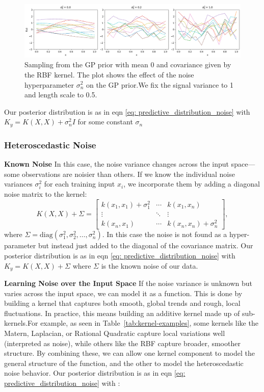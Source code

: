 \documentclass{article}
\begin{document}
\begin{figure}[H]
    \centering
        \includegraphics[width=\textwidth]{LatexPlots/1dplots/Kernel_noise.png}
        \caption{Sampling from the GP prior with mean 0 and covariance given by the RBF kernel.
        The plot shows the effect of the noise hyperparameter \(\sigma_n^2\) on the GP prior.We fix the signal variance to 1 and length scale to 0.5.}
    \label{fig: kernel_noise}
\end{figure}
\noindent
Our posterior distribution is as in eqn \ref{eq:  predictive_distribution_noise} with \(K_y = K(X, X) + \sigma_n^2 I \) for some constant \(\sigma_n\)


\subsubsection*{Heteroscedastic Noise}  
\textbf{Known Noise}
\noindent
In this case, the noise variance changes across the input space—some observations are noisier than others. If we know the individual noise variances \( \sigma_i^2 \) for each training input \( x_i \), we incorporate them by adding a diagonal noise matrix to the kernel:
\[
K(X, X) + \Sigma = 
\begin{bmatrix}
k(x_1, x_1) + \sigma_1^2 & \cdots & k(x_1, x_n) \\
\vdots & \ddots & \vdots \\
k(x_n, x_1) & \cdots & k(x_n, x_n) + \sigma_n^2
\end{bmatrix},
\]
where \( \Sigma = \text{diag}(\sigma_1^2, \sigma_2^2, \dots, \sigma_n^2) \).
In this case the noise is not found as a hyper-parameter but instead just added to the diagonal of the covariance matrix.
Our posterior distribution is as in eqn \ref{eq:  predictive_distribution_noise} with \(K_y =K(X, X) + \Sigma \) where \(\Sigma\) is the known noise of our data. 

\vspace{1em}
\noindent
\textbf{Learning Noise over the Input Space}
\noindent
If the noise variance is unknown but varies across the input space, we can model it as a function. 
This is done by building a kernel that captures both smooth, global trends and rough, local fluctuations. 
In practice, this means building an additive kernel made up of sub-kernels.For example, as seen in Table~\ref{tab:kernel-examples}, some kernels like the Matern, Laplacian, or Rational Quadratic capture local variations well (interpreted as noise),
while others like the RBF capture broader, smoother structure. By combining these, we can allow one kernel component to model the general structure of the function, and the other to model the heteroscedastic noise behavior. 
Our posterior distribution is as in eqn \ref{eq:  predictive_distribution_noise} with :
\end{document}
